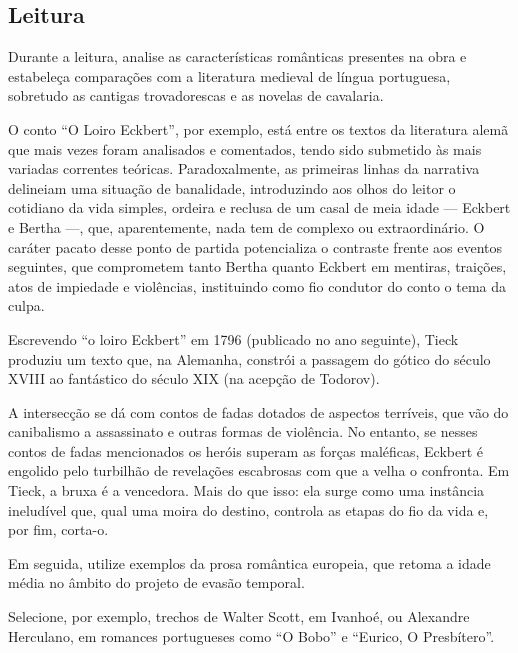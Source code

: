 \documentclass[11pt]{extarticle}
\begin{document}
\subsection{Leitura}


Durante a leitura, analise as características românticas
presentes na obra e estabeleça comparações com a literatura medieval de
língua portuguesa, sobretudo as cantigas trovadorescas e as novelas de
cavalaria.

O conto ``O Loiro Eckbert'', por exemplo, está entre os textos da
literatura alemã que mais vezes foram analisados e comentados, tendo
sido submetido às mais variadas correntes teóricas. Paradoxalmente, as
primeiras linhas da narrativa delineiam uma situação de banalidade,
introduzindo aos olhos do leitor o cotidiano da vida simples, ordeira e
reclusa de um casal de meia idade --- Eckbert e Bertha ---, que,
aparentemente, nada tem de complexo ou extraordinário. O caráter pacato
desse ponto de partida potencializa o contraste frente aos eventos
seguintes, que comprometem tanto Bertha quanto Eckbert em mentiras,
traições, atos de impiedade e violências, instituindo como fio condutor
do conto o tema da culpa.

Escrevendo ``o loiro Eckbert'' em 1796 (publicado no ano seguinte),
Tieck produziu um texto que, na Alemanha, constrói a passagem do gótico
do século XVIII ao fantástico do século XIX (na acepção de Todorov).


A intersecção se dá com contos de fadas dotados de aspectos terríveis,
que vão do canibalismo a assassinato e outras formas de violência. No
entanto, se nesses contos de fadas mencionados os heróis superam as
forças maléficas, Eckbert é engolido pelo turbilhão de revelações
escabrosas com que a velha o confronta. Em Tieck, a bruxa é a vencedora.
Mais do que isso: ela surge como uma instância ineludível que, qual uma
moira do destino, controla as etapas do fio da vida e, por fim, corta-o.

Em seguida, utilize exemplos da prosa romântica europeia, que retoma a
idade média no âmbito do projeto de evasão temporal.

Selecione, por exemplo, trechos de Walter Scott, em Ivanhoé, ou
Alexandre Herculano, em romances portugueses como ``O Bobo'' e ``Eurico,
O Presbítero''.
\end{document}
